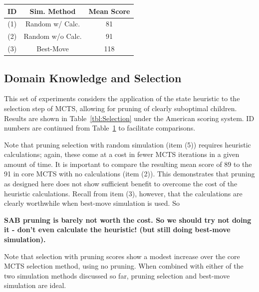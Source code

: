 \documentclass[letterpaper]{article}
\begin{document}
\begin{table}
\label{tbl:Simulate}
\centering
\begin{tabular}{c c c}
\hline
ID & Sim. Method & Mean Score \\
\hline
(1) & Random w/ Calc. & 81 \\
(2) & Random w/o Calc. & 91 \\
(3) & Best-Move & 118 \\
\hline
\end{tabular}
\end{table}

\subsection{Domain Knowledge and Selection}

%

This set of experiments considers the application of the state heuristic to the selection step of MCTS, allowing for pruning of clearly suboptimal children. Results are shown in Table~\ref{tbl:Selection} under the American scoring system. ID numbers are continued from Table~\ref{tbl:Simulate} to facilitate comparisons.

Note that pruning selection with random simulation (item (5)) requires heuristic calculations; again, these come at a cost in fewer MCTS iterations in a given amount of time. It is important to compare the resulting mean score of 89 to the 91 in core MCTS with no calculations (item (2)). This demonstrates that pruning as designed here does not show sufficient benefit to overcome the cost of the heuristic calculations. Recall from item (3), however, that the calculations are clearly worthwhile when best-move simulation is used. So


{\bf SAB pruning is barely not worth the cost. So we should try not doing it - don't even calculate the heuristic! (but still doing best-move simulation).}



Note that selection with pruning scores show a modest increase over the core MCTS selection method, using no pruning. When combined with either of the two simulation methods discussed so far, pruning selection and best-move simulation are ideal.
\end{document}
